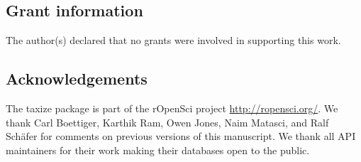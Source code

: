 \documentclass[10pt,a4paper,twocolumn]{article}\usepackage[]{graphicx}\usepackage[]{color}
\begin{document}
\subsection*{Grant information}
The author(s) declared that no grants were involved in supporting this work.

\subsection*{Acknowledgements}
The taxize package is part of the rOpenSci project \url{http://ropensci.org/}. We thank Carl Boettiger, Karthik Ram, Owen Jones, Naim Matasci, and Ralf Sch\"{a}fer for comments on previous versions of this manuscript. We thank all API maintainers for their work making their databases open to the public.

\nocite{*}
{\small
}
\end{document}

